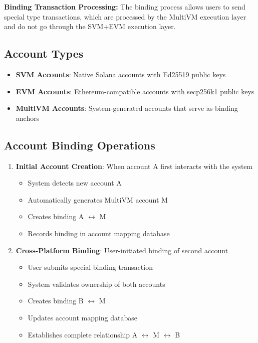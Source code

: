 \documentclass[11pt,a4paper]{article}
\begin{document}
\textbf{Binding Transaction Processing:}
The binding process allows users to send special type transactions, which are processed by the MultiVM execution layer and do not go through the SVM+EVM execution layer.

\subsection{Account Types}
\begin{itemize}
    \item \textbf{SVM Accounts}: Native Solana accounts with Ed25519 public keys
    \item \textbf{EVM Accounts}: Ethereum-compatible accounts with secp256k1 public keys
    \item \textbf{MultiVM Accounts}: System-generated accounts that serve as binding anchors
\end{itemize}

\subsection{Account Binding Operations}
\begin{enumerate}
    \item \textbf{Initial Account Creation}: When account A first interacts with the system
    \begin{itemize}
        \item System detects new account A
        \item Automatically generates MultiVM account M
        \item Creates binding A $\leftrightarrow$ M
        \item Records binding in account mapping database
    \end{itemize}
    
    \item \textbf{Cross-Platform Binding}: User-initiated binding of second account
    \begin{itemize}
        \item User submits special binding transaction
        \item System validates ownership of both accounts
        \item Creates binding B $\leftrightarrow$ M
        \item Updates account mapping database
        \item Establishes complete relation\-ship A $\leftrightarrow$ M $\leftrightarrow$ B
    \end{itemize}
\end{enumerate}
\end{document}
